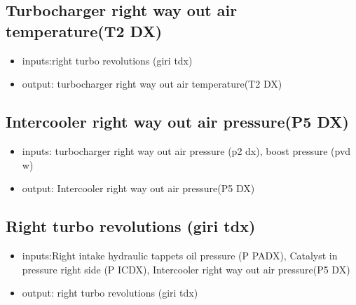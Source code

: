 

%
%
%
%

\newpage

\subsection{Turbocharger right way out air temperature(T2 DX)}
\begin{itemize}
	\item{inputs:right turbo revolutions (giri tdx)}
	\item{output: turbocharger right way out air temperature(T2 DX)}
\end{itemize}



%
%
%
%

\newpage

\subsection{Intercooler right way out air pressure(P5 DX)}
\begin{itemize}
	\item{inputs: turbocharger right way out air pressure (p2 dx), boost pressure (pvd w)}
	\item{output: Intercooler right way out air pressure(P5 DX)}
\end{itemize}



%
%
%
%

\newpage

\subsection{Right turbo revolutions (giri tdx)} %
\begin{itemize}
	\item{inputs:Right intake hydraulic tappets oil pressure (P PADX), Catalyst in pressure right side (P ICDX), Intercooler right way out air pressure(P5 DX)}
	\item{output: right turbo revolutions (giri tdx)}
\end{itemize}

